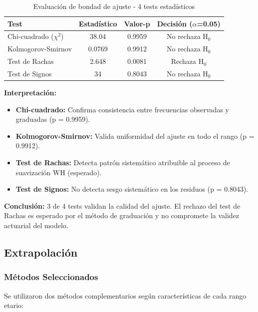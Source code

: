 \begin{table}[H]
\centering
\caption{Evaluación de bondad de ajuste - 4 tests estadísticos}
\label{tab:tests_bondad}
\begin{tabular}{lccc}
\toprule
\tableheadercolor
\textbf{Test} & \textbf{Estadístico} & \textbf{Valor-p} & \textbf{Decisión ($\alpha$=0.05)} \\
\midrule
Chi-cuadrado ($\chi^2$) & 38.04 & 0.9959 & No rechaza H$_0$ \\
Kolmogorov-Smirnov & 0.0769 & 0.9912 & No rechaza H$_0$ \\
Test de Rachas & 2.648 & 0.0081 & Rechaza H$_0$ \\
Test de Signos & 34 & 0.8043 & No rechaza H$_0$ \\
\bottomrule
\end{tabular}
\end{table}

\textbf{Interpretación:}

\begin{itemize}
    \item \textbf{Chi-cuadrado:} Confirma consistencia entre frecuencias observadas y graduadas (p = 0.9959).
    \item \textbf{Kolmogorov-Smirnov:} Valida uniformidad del ajuste en todo el rango (p = 0.9912).
    \item \textbf{Test de Rachas:} Detecta patrón sistemático atribuible al proceso de suavización WH (esperado).
    \item \textbf{Test de Signos:} No detecta sesgo sistemático en los residuos (p = 0.8043).
\end{itemize}

\textbf{Conclusión:} 3 de 4 tests validan la calidad del ajuste. El rechazo del test de Rachas es esperado por el método de graduación y no compromete la validez actuarial del modelo.

\subsection{Extrapolación}

\subsubsection{Métodos Seleccionados}

Se utilizaron dos métodos complementarios según características de cada rango etario:

